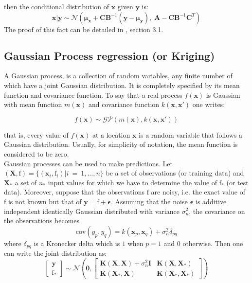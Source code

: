 then the conditional distribution of $\bm{x}$ given $\bm{y}$ is:
\begin{equation} \label{eq:cond}
  \bm{x}|\bm{y} \sim \mathcal{N}\left(\bm{\mu_x} + \bm{C} \bm{B}^{-1}(\bm{y}-\bm{\mu_y}), \; \bm{A} - \bm{C}\bm{B}^{-1}\bm{C}^T \right)
\end{equation}
The proof of this fact can be detailed in \citep{Bishop}, section 3.1.

\subsection{Gaussian Process regression (or Kriging)}
A Gaussian process, is a collection of random variables, any finite number of which have a joint Gaussian distribution. It is completely specified by its mean function and covariance function. To say that a real process $f(\bm{x})$ is Gaussian with mean function $m(\bm{x})$ and covariance function $k(\bm{x}, \bm{x'})$ one writes: 

\begin{equation}
  f(\bm{x}) \sim \mathcal{GP}(m(\bm{x}), k(\bm{x}, \bm{x'}))
\end{equation}

that is, every value of $f(\bm{x})$ at a location $\bm{x}$ is a random variable that follows a Gaussian distribution. Usually, for simplicity of notation, the mean function is considered to be zero. \\

Gaussian processes can be used to make predictions. Let $(\bm{X}, \bm{\mathrm{f}}) = \{(\bm{x}_i, \mathrm{f}_i)|i \: = \: 1, \ldots, n\}$ be a set of observations (or training data) and $\bm{X}_*$ a set of $n_*$ input values for which we have to determine the value of $\mathrm{f}_*$ (or test data). Moreover, suppose that the observations $\mathrm{f}$ are noisy, i.e. the exact value of $\mathrm{f}$ is not known but that of $\bm{y} = \bm{\mathrm{f}} + \bm{\epsilon}$. Assuming that the noise $\bm{\epsilon}$ is additive independent identically Gaussian distributed with variance $\sigma_n^2$, the covariance on the observations becomes
\begin{equation}
  \text{cov}(y_p, y_q) = k(\bm{x}_p, \bm{x}_q) + \sigma_n^2 \delta_{pq}
\end{equation} 
where $\delta_{pq}$ is a Kronecker delta which is $1$ when $p = 1$ and $0$ otherwise. Then one can write the joint distribution as:
\begin{equation}
  \begin{bmatrix}
    \bm{y} \\ \bm{\mathrm{f}}_*
  \end{bmatrix}
  \sim \mathcal{N}\left(
  \bm{0}, \begin{bmatrix}
      \bm{K}(\bm{X},\bm{X})+\sigma_n^2 \bm{I} & \bm{K}(\bm{X},\bm{X}_*) \\ \bm{K}(\bm{X}_*,\bm{X}) & \bm{K}(\bm{X}_*,\bm{X}_*)
    \end{bmatrix} \right)
\end{equation}

